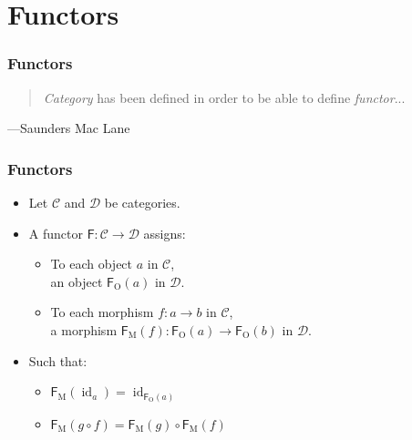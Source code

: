 \documentclass{beamer}
\DeclareMathOperator{\obj}{O}
\DeclareMathOperator{\mor}{M}
\DeclareMathOperator{\id}{id}
\newcommand{\idO}[1]{\natO{\id}{#1}}
\newcommand{\comp}{\ensuremath{\mathrel{\circ}}}
\newcommand{\cat}[1]{\ensuremath{\mathcal{#1}}}
\newcommand{\func}[1]{\ensuremath{\mathsf{#1}}}
\newcommand{\funcO}[1]{\ensuremath{\func{#1}_{\obj}}}
\newcommand{\funcM}[1]{\ensuremath{\func{#1}_{\mor}}}
\newcommand{\nat}[1]{\ensuremath{#1}}
\newcommand{\natO}[2]{\ensuremath{\nat{#1}_{#2}}}
\begin{document}

\section{Functors}


\begin{frame}
  \frametitle{Functors}

  \begin{quote}
    \emph{Category} has been defined in order to be able to define
    \emph{functor}...
  \end{quote}
  \hfill ---Saunders Mac Lane

\end{frame}


\begin{frame}[label={def:functor}]
  \frametitle{Functors}

  \begin{definition}[Functor]
    \begin{itemize}
    \item
      Let \cat{C} and \cat{D} be categories.
    \item
      A functor $\func{F}: \cat{C} \to \cat{D}$ assigns:
      \begin{itemize}
      \item
        To each object $a$ in \cat{C},\\ an object $\funcO{F}(a)$ in
        \cat{D}.
      \item
        To each morphism $f: a \to b$ in \cat{C},\\ a morphism
        $\funcM{F}(f): \funcO{F}(a) \to \funcO{F}(b)$ in \cat{D}.
      \end{itemize}
    \item
      Such that:
      \begin{itemize}
      \item
        $\funcM{F}(\idO{a}) = \idO{\funcO{F}(a)}$
      \item
        $\funcM{F}(g \comp f) = \funcM{F}(g) \comp \funcM{F}(f)$
      \end{itemize}
    \end{itemize}
  \end{definition}

\end{frame}
\end{document}
